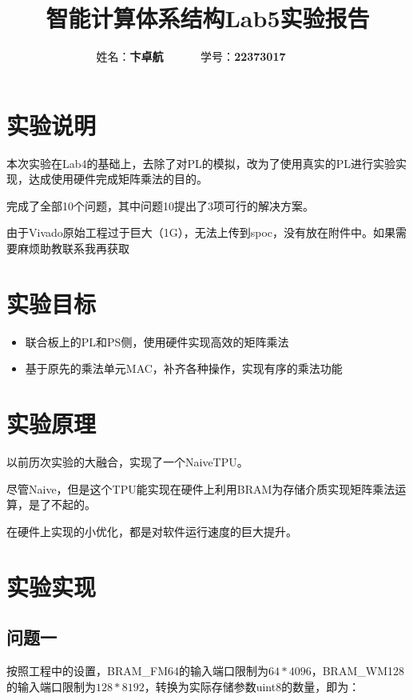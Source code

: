 \documentclass[12pt,a4paper]{article}
\begin{document}
\title{智能计算体系结构Lab5实验报告}
\date{}

\author{
姓名：\textbf{卞卓航}~~~~~~
学号：\textbf{22373017}~~~~~~
}

\maketitle

\section{实验说明}

本次实验在Lab4的基础上，去除了对PL的模拟，改为了使用真实的PL进行实验实现，达成使用硬件完成矩阵乘法的目的。

完成了全部10个问题，其中问题10提出了3项可行的解决方案。

由于Vivado原始工程过于巨大（1G），无法上传到spoc，没有放在附件中。如果需要麻烦助教联系我再获取~

\section{实验目标}

\begin{itemize}
\item
  联合板上的PL和PS侧，使用硬件实现高效的矩阵乘法
\item
  基于原先的乘法单元MAC，补齐各种操作，实现有序的乘法功能
\end{itemize}

\section{实验原理}

以前历次实验的大融合，实现了一个NaiveTPU。

尽管Naive，但是这个TPU能实现在硬件上利用BRAM为存储介质实现矩阵乘法运算，是了不起的。

在硬件上实现的小优化，都是对软件运行速度的巨大提升。

\section{实验实现}

\subsection{问题一}

按照工程中的设置，BRAM\_FM64的输入端口限制为\(64 * 4096\)，BRAM\_WM128的输入端口限制为\(128 * 8192\)，转换为实际存储参数uint8的数量，即为：
\end{document}
